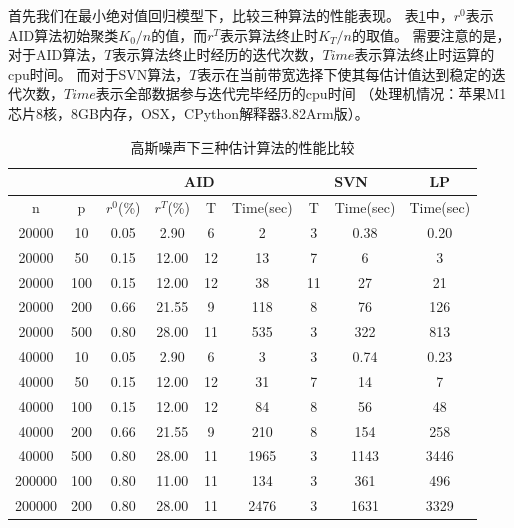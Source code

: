 首先我们在最小绝对值回归模型下，比较三种算法的性能表现。
表\ref{tab-performance}中，$r^0$表示AID算法初始聚类$K_0/n$的值，而$r^T$表示算法终止时$K_T/n$的取值。
需要注意的是，对于AID算法，$T$表示算法终止时经历的迭代次数，$Time$表示算法终止时运算的cpu时间。
而对于SVN算法，$T$表示在当前带宽选择下使其每估计值达到稳定的迭代次数，$Time$表示全部数据参与迭代完毕经历的cpu时间
（处理机情况：苹果M1芯片8核，8GB内存，OSX，CPython解释器3.82Arm版）。
\begin{table}[H]
    \small
    \caption{\small 高斯噪声下三种估计算法的性能比较}
    \label{tab-performance}
    \centering
    \begin{tabular}{@{}ccccccccc@{}}
    \toprule
           &     & \multicolumn{4}{c}{AID}        & \multicolumn{2}{c}{SVN} & LP        \\ \midrule
    n      & p   & $r^0$(\%) & $r^T$(\%) & T  & Time(sec) & T      & Time(sec)      & Time(sec) \\ \midrule
    20000  & 10  & 0.05  & 2.90  & 6  & 2         &  3      &         0.38       & 0.20      \\
    20000  & 50 & 0.15  & 12.00 & 12 & 13        &   7     &          6     & 3       \\
    20000  & 100 & 0.15  & 12.00 & 12 & 38        &  11      &         27    & 21         \\
    20000  & 200 & 0.66  & 21.55 & 9  & 118        &   8     &          76      & 126        \\
    20000  & 500 & 0.80  & 28.00 & 11 &  535      &  3      &              322  &     813 \\ 
    40000  & 10  & 0.05  & 2.90  & 6  & 3        &  3      &         0.74      & 0.23     \\
    40000  & 50 & 0.15  & 12.00 & 12 & 31        &   7     &          14     & 7       \\
    40000  & 100 & 0.15  & 12.00 & 12 & 84       &  8      &         56    & 48         \\
    40000  & 200 & 0.66  & 21.55 & 9  & 210        &   8     &          154     & 258        \\
    40000  & 500 & 0.80  & 28.00 & 11 & 1965       &  3      &             1143   &  3446      \\ 
    200000  & 100 & 0.80  & 11.00 & 11 & 134       &  3      &          361      &   496     \\ 
    200000  & 200 & 0.80  & 28.00 & 11 & 2476       &  3      &          1631      &   3329     \\ 
    \bottomrule
    \end{tabular}
\end{table}

